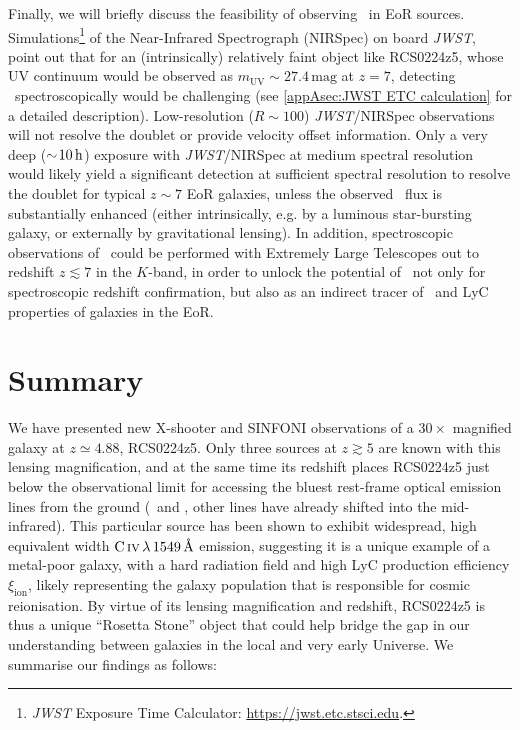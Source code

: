 Finally, we will briefly discuss the feasibility of observing \MgII\ in EoR sources. Simulations\footnote{\textit{JWST} Exposure Time Calculator: \url{https://jwst.etc.stsci.edu}.} of the Near-Infrared Spectrograph (NIRSpec) on board \textit{JWST}, point out that for an (intrinsically) relatively faint object like RCS0224z5, whose UV continuum would be observed as $m_\text{UV} \sim 27.4 \, \mathrm{mag}$ at $z = 7$, detecting \MgII\ spectroscopically would be challenging (see \cref{appAsec:JWST ETC calculation} for a detailed description). Low-resolution ($R \sim 100$) \textit{JWST}/NIRSpec observations will not resolve the doublet or provide velocity offset information. Only a very deep ($\sim \! 10 \, \mathrm{h}$) exposure with \textit{JWST}/NIRSpec at medium spectral resolution would likely yield a significant detection at sufficient spectral resolution to resolve the doublet for typical $z \sim 7$ EoR galaxies, unless the observed \MgII\ flux is substantially enhanced (either intrinsically, e.g. by a luminous star-bursting galaxy, or externally by gravitational lensing). In addition, spectroscopic observations of \MgII\ could be performed with Extremely Large Telescopes out to redshift $z \lesssim 7$ in the $K$-band, in order to unlock the potential of \MgII\ not only for spectroscopic redshift confirmation, but also as an indirect tracer of \lya\ and LyC properties of galaxies in the EoR.

\section{Summary}
\label{chAsec:Summary}

We have presented new X-shooter and SINFONI observations of a $30 \times$ magnified galaxy at $z \simeq 4.88$, RCS0224z5. Only three sources at $z \gtrsim 5$ are known with this lensing magnification, and at the same time its redshift places RCS0224z5 just below the observational limit for accessing the bluest rest-frame optical emission lines from the ground (\OII\ and \NeIII, other lines have already shifted into the mid-infrared). This particular source has been shown to exhibit widespread, high equivalent width $\CIV \, \lambda \, 1549 \, \Angstrom$ emission, suggesting it is a unique example of a metal-poor galaxy, with a hard radiation field and high LyC production efficiency $\xi_\text{ion}$, likely representing the galaxy population that is responsible for cosmic reionisation. By virtue of its lensing magnification and redshift, RCS0224z5 is thus a unique ``Rosetta Stone'' object that could help bridge the gap in our understanding between galaxies in the local and very early Universe. We summarise our findings as follows:

